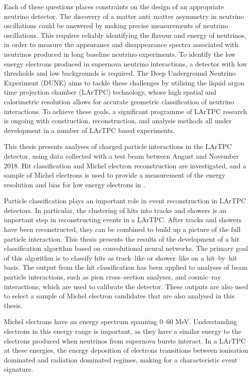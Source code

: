 Each of these questions places constraints on the design of an appropriate 
neutrino detector. The discovery of a matter anti--matter asymmetry
in neutrino oscillations could be answered by making precise measurements of
neutrino oscillations. This requires reliably identifying the flavour and energy
of neutrinos, in order to measure the appearance and disappearance spectra
associated with neutrinos produced in long baseline neutrino experiments. To
identify the low energy electrons produced in supernova neutrino interactions, a
detector with low thresholds and low backgrounds is required. The Deep
Underground Neutrino Experiment (DUNE) aims to tackle these challenges by
utilising the liquid argon time projection chamber (LArTPC) technology, whose
high spatial and calorimetric resolution allows for accurate geometric
classification of neutrino interactions. To achieve these goals, a significant 
programme of LArTPC research is ongoing with construction, reconstruction, and 
analysis methods all under development in a number of LArTPC based 
experiments\cite{Acciarri:2016smi, Cavanna:2014iqa, Antonello:2015lea, 
Abi:2017aow}. 

This thesis presents analyses of charged particle interactions in the
\protodune{} LArTPC detector, using data collected with a test beam between 
August and November 2018. Hit classification and Michel electron reconstruction 
are investigated, and a sample of Michel electrons is used to provide a 
measurement of the energy resolution and bias for low energy electrons in 
\protodune{}.

Particle classification plays an important role in event reconstruction in 
LArTPC detectors. In particular, the clustering of hits into tracks and 
showers is an important step in reconstructing events in a LArTPC. After tracks
and showers have been reconstructed, they can be combined to build up a picture
of the full particle interaction. This thesis presents the results of the 
development of a hit classification algorithm based on convolutional neural
networks. The primary goal of this algorithm is to classify hits as 
track--like or shower--like on a hit--by--hit basis. The output from the hit 
classification has been applied to analyses of beam particle interactions, 
such as pion cross--section analyses, and cosmic--ray interactions, which 
are used to calibrate the \protodune{} detector. These outputs are also used 
to select a sample of Michel electron candidates that are also analysed in 
this thesis.

Michel electrons have an energy spectrum spanning 0--60 MeV. Understanding
electrons in this energy range is important, as they have a similar energy to 
the electrons produced when neutrinos from supernova bursts interact. In a 
LArTPC at these energies, the energy deposition of electrons transitions 
between ionisation dominated and radiation dominated regimes, making for a 
characteristic event signature. 

